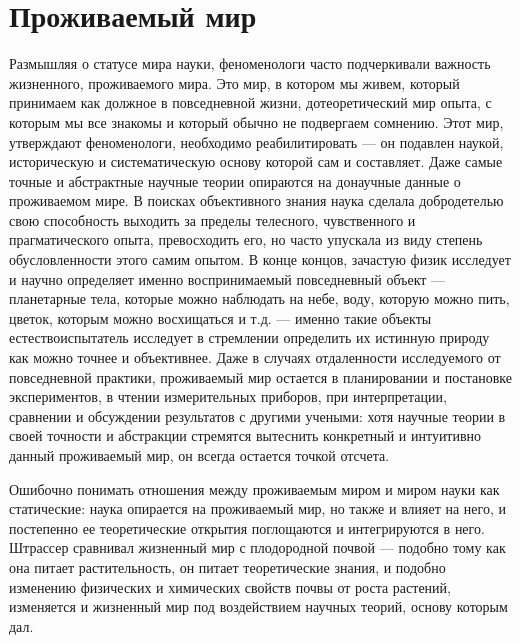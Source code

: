 \documentclass[11pt]{book}
\begin{document}
\section{Проживаемый мир}

Размышляя о статусе мира науки, феноменологи часто подчеркивали важность жизненного, проживаемого мира. Это мир, в котором мы живем, который принимаем как должное в повседневной жизни, дотеоретический мир опыта, с которым мы все знакомы и который обычно не подвергаем сомнению. Этот мир, утверждают феноменологи, необходимо реабилитировать --- он подавлен наукой, историческую и систематическую основу которой сам и составляет. Даже самые точные и абстрактные научные теории опираются на донаучные данные о проживаемом мире. В поисках объективного знания наука сделала добродетелью свою способность выходить за пределы телесного, чувственного и прагматического опыта, превосходить его, но часто упускала из виду степень обусловленности этого самим опытом. В конце концов, зачастую физик исследует и научно определяет именно воспринимаемый повседневный объект --- планетарные тела, которые можно наблюдать на небе, воду, которую можно пить, цветок, которым можно восхищаться и т.д. --- именно такие объекты естествоиспытатель исследует в стремлении определить их истинную природу как можно точнее и объективнее. Даже в случаях отдаленности исследуемого от повседневной практики, проживаемый мир остается в планировании и постановке экспериментов, в чтении измерительных приборов, при интерпретации, сравнении и обсуждении результатов с другими учеными: хотя научные теории в своей точности и абстракции стремятся вытеснить конкретный и интуитивно данный проживаемый мир, он всегда остается точкой отсчета.

Ошибочно понимать отношения между проживаемым миром и миром науки как статические: наука опирается на проживаемый мир, но также и влияет на него, и постепенно ее теоретические открытия поглощаются и интегрируются в него. Штрассер сравнивал жизненный мир с плодородной почвой --- подобно тому как она питает растительность, он питает теоретические знания, и подобно изменению физических и химических свойств почвы от роста растений, изменяется и жизненный мир под воздействием научных теорий, основу которым дал.
\end{document}
